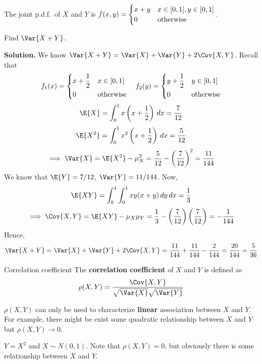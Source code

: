 \begin{Example}{}{}
    The joint p.d.f.\ of $ X $ and $ Y $ is
    $ f(x,y)=\begin{cases}
            x+y & x\in\interval{0}{1},y\in\interval{0}{1} \\
            0   & \text{otherwise}
        \end{cases} $.

    Find $ \Var{X+Y} $.

    \textbf{Solution.} We know $ \Var{X+Y}=\Var{X}+\Var{Y}+2\Cov{X,Y} $. Recall
    that
    \[ f_1(x)=\begin{dcases}
            x+\frac{1}{2} & x\in\interval{0}{1} \\
            0             & \text{otherwise}
        \end{dcases}\quad
        f_2(y)=\begin{dcases}
            y+\frac{1}{2} & y\in\interval{0}{1} \\
            0             & \text{otherwise}
        \end{dcases} \]
    \[ \E{X}=\int_{0}^{1} x\left( x+\frac{1}{2}  \right)\, d{x} =
        \frac{7}{12} \]
    \[ \E{X^2}=\int_{0}^{1} x^2\left( x+\frac{1}{2}  \right)\, d{x}=
        \frac{5}{12} \]
    \[ \implies\Var{X}=\E{X^2}-\mu_X^2=\frac{5}{12}-\left( \frac{7}{12} \right)^2=\frac{11}{144}  \]
    We know that $ \E{Y}=7/12 $, $ \Var{Y}=11/144 $. Now,
    \[ \E{XY}=
        \int_{0}^{1} \int_{0}^{1} x y(x+y)\, d{y}\, d{x}=\frac{1}{3}  \]
    \[ \implies \Cov{X,Y}=\E{XY}-\mu_X\mu_Y=
        \frac{1}{3} -\left( \frac{7}{12}  \right)\left( \frac{7}{12}  \right)=
        -\frac{1}{144}  \]
    Hence,
    \[ \Var{X+Y}=\Var{X}+\Var{Y}+2\Cov{X,Y}=
        \frac{11}{144} +\frac{11}{144} -\frac{2}{144} =\frac{20}{144}=\frac{5}{36} \]
\end{Example}
\begin{Definition}{Correlation coefficient}{}
    The \textbf{correlation coefficient} of $ X $ and $ Y $ is defined as
    \[ \rho(X,Y)=\frac{\Cov{X,Y}}{\sqrt{\Var{X}}\sqrt{\Var{Y}}}  \]
\end{Definition}
\begin{Remark}{}{}
    $ \rho(X,Y) $ can only be used to characterize \textbf{linear} association
    between $ X $ and $ Y $. For example, there might be exist some quadratic
    relationship between $ X $ and $ Y $ but $ \rho(X,Y)\to 0 $.
\end{Remark}
\begin{Example}{}{}
    $ Y=X^2 $ and $ X \sim N(0,1) $. Note that $ \rho(X,Y)=0 $,
    but obviously there is some relationship between $ X $ and $ Y $.
\end{Example}

